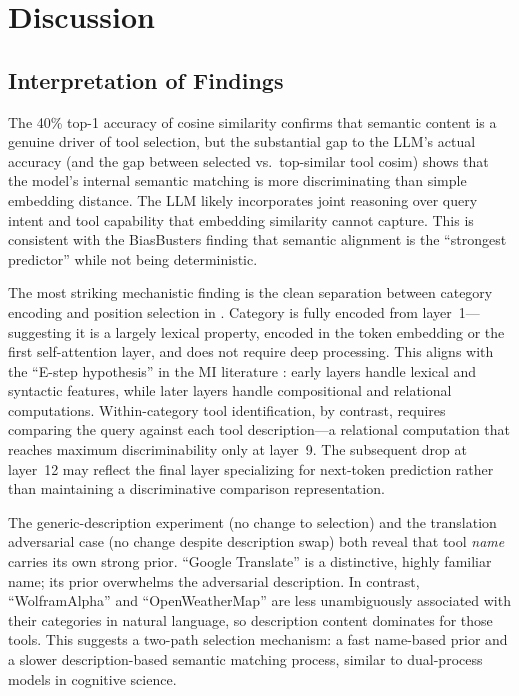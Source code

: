 \section{Discussion}
\label{sec:discussion}

\subsection{Interpretation of Findings}

The 40\% top-1 accuracy of cosine similarity confirms that semantic content is a genuine
driver of tool selection, but the substantial gap to the LLM's actual accuracy (and the
gap between selected vs.\ top-similar tool cosim) shows that the model's internal semantic
matching is more discriminating than simple embedding distance.  The LLM likely incorporates
joint reasoning over query intent and tool capability that embedding similarity
cannot capture.  This is consistent with the BiasBusters finding \citep{blankenstein2025biasbust}
that semantic alignment is the ``strongest predictor'' while not being deterministic.

The most striking mechanistic finding is the clean separation between category encoding
and position selection in \gpttwo.  Category is fully encoded from layer~1---suggesting
it is a largely lexical property, encoded in the token embedding or the first
self-attention layer, and does not require deep processing.  This aligns with the
``E-step hypothesis'' in the MI literature \citep{sharkey2025open}: early layers handle
lexical and syntactic features, while later layers handle compositional and relational
computations.  Within-category tool identification, by contrast, requires comparing the
query against each tool description---a relational computation that reaches maximum
discriminability only at layer~9.  The subsequent drop at layer~12 may reflect the final
layer specializing for next-token prediction rather than maintaining a discriminative
comparison representation.

The generic-description experiment (no change to selection) and the translation
adversarial case (no change despite description swap) both reveal that tool \emph{name}
carries its own strong prior.  ``Google Translate'' is a distinctive, highly familiar
name; its prior overwhelms the adversarial description.  In contrast, ``WolframAlpha'' and
``OpenWeatherMap'' are less unambiguously associated with their categories in natural
language, so description content dominates for those tools.  This suggests a two-path
selection mechanism: a fast name-based prior and a slower description-based semantic
matching process, similar to dual-process models in cognitive science.

